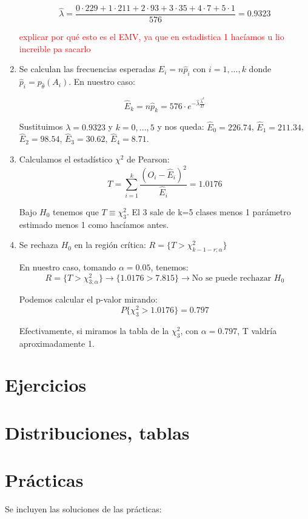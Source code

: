 \documentclass[nochap]{apuntes}
\begin{document}
\begin{example}
\begin{enumerate}
$$ \hat{\lambda} = \frac{0\cdot229 + 1\cdot211+2\cdot93+3\cdot35+4\cdot7+5\cdot1}{576}=0.9323$$

\textcolor{red}{explicar por qué esto es el EMV, ya que en estadistica 1 hacíamos u lio increible pa sacarlo}

\item Se calculan las frecuencias esperadas $\hat{E}_i=n\hat{p}_i$ con $i=1,...,k$ donde $\hat{p}_i = p_{\hat{\theta}}(A_i)$. En nuestro caso:

$$\hat{E}_k = n\hat{p}_k = 576\cdot e^{-\hat{\lambda}\frac{\hat{\lambda}^k}{k!}}$$

Sustituimos $\lambda = 0.9323$ y $k=0,...,5$ y nos queda: $\hat{E}_0 = 226.74 $, $\hat{E}_1 = 211.34 $, $\hat{E}_2 = 98.54$, $\hat{E}_3 = 30.62$, $\hat{E}_4 = 8.71$.

\item Calculamos el estadístico $\chi^2$ de Pearson:
\[
T=\sum_{i=1}^k \frac{(O_i-\hat{E}_i)^2}{\hat{E}_i} = 1.0176
\]

Bajo $H_0$ tenemos que $T \equiv \chi^2_3$. El 3 sale de k=5 clases menos 1 parámetro estimado menos 1 como hacíamos antes.

\item Se rechaza $H_0$ en la región crítica: $R=\{T>\chi^2_{k-1-r;\alpha}  \}$

En nuestro caso, tomando $\alpha = 0.05$, tenemos: $$R=\{T>\chi^2_{3;\alpha} \} \rightarrow \{1.0176>7.815 \} \rightarrow \text{No se puede rechazar } H_0$$

Podemos calcular el p-valor mirando:
$$P\{\chi^2_3 > 1.0176\} = 0.797$$

Efectivamente, si miramos la tabla de la $\chi^2_3$, con $\alpha =0.797$, T valdría aproximadamente 1.
\end{enumerate}

\end{example}






\appendix
\chapter{Ejercicios}


\chapter{Distribuciones, tablas}



\chapter{Prácticas}
Se incluyen las soluciones de las prácticas:

\end{document}

